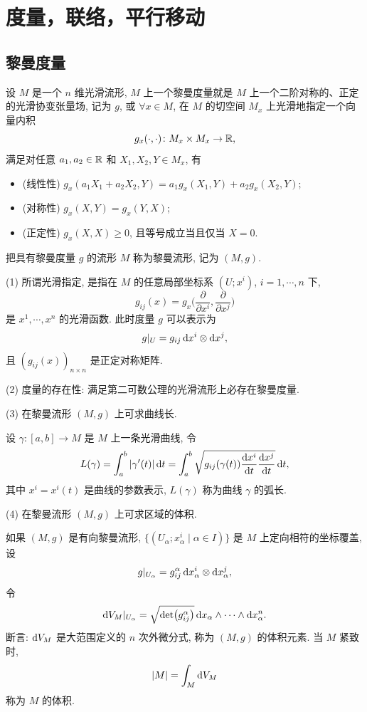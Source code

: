 \chapter{度量，联络，平行移动}



\section{黎曼度量}



\begin{definition}
  设 $M$ 是一个 $n$ 维光滑流形, $M$ 上一个黎曼度量就是 $M$ 上一个二阶对称的、正定的光滑协变张量场,
  记为 $g$, 或 $\forall x\in M$, 在 $M$ 的切空间 $M_x$ 上光滑地指定一个向量内积
  \[g_x(\cdot,\cdot)\colon M_x\times M_x\to\mathbb{R},\]
  满足对任意 $a_1,a_2\in\mathbb{R}$ 和 $X_1,X_2,Y\in M_x$, 有
  \begin{itemize}
    \item (线性性) $g_x(a_1X_1 + a_2X_2, Y) = a_1g_x(X_1,Y) + a_2g_x(X_2,Y)$;
    \item (对称性) $g_x(X,Y) = g_x(Y,X)$;
    \item (正定性) $g_x(X,X)\geq 0$, 且等号成立当且仅当 $X=0$.
  \end{itemize}
  把具有黎曼度量 $g$ 的流形 $M$ 称为黎曼流形, 记为 $(M,g)$.
\end{definition}


\begin{remark}
  (1) 所谓光滑指定, 是指在 $M$ 的任意局部坐标系 $(U;x^i)$, $i=1,\cdots,n$ 下,
  \[g_{ij}(x) = g_x\biggl(\frac{\partial}{\partial x^i}, \frac{\partial}{\partial x^j}\biggr)\]
  是 $x^1,\cdots,x^n$ 的光滑函数. 此时度量 $g$ 可以表示为
  \[g|_U = g_{ij}\mathop{}\!\mathrm{d} x^i\otimes\mathop{}\!\mathrm{d} x^j,\]
  且 $(g_{ij}(x))_{n\times n}$ 是正定对称矩阵.

  (2) 度量的存在性: 满足第二可数公理的光滑流形上必存在黎曼度量.

  (3) 在黎曼流形 $(M,g)$ 上可求曲线长.

  设 $\gamma: [a,b]\to M$ 是 $M$ 上一条光滑曲线, 令
  \[L(\gamma) = \int_a^b |\gamma'(t)|\mathop{}\!\mathrm{d} t
    = \int_a^b \sqrt{g_{ij}(\gamma(t))\frac{\mathop{}\!\mathrm{d} x^i}{\mathop{}\!\mathrm{d} t}\frac{\mathop{}\!\mathrm{d} x^j}{\mathop{}\!\mathrm{d} t}}\mathop{}\!\mathrm{d} t,\]
  其中 $x^i=x^i(t)$ 是曲线的参数表示, $L(\gamma)$ 称为曲线 $\gamma$ 的弧长.

  (4) 在黎曼流形 $(M,g)$ 上可求区域的体积.

  如果 $(M,g)$ 是有向黎曼流形, $\{(U_{\alpha}; x_{\alpha}^i\mid \alpha\in I)\}$
  是 $M$ 上定向相符的坐标覆盖, 设
  \[g|_{U_{\alpha}} = g_{ij}^{\alpha}\mathop{}\!\mathrm{d} x_{\alpha}^i\otimes\mathop{}\!\mathrm{d} x_{\alpha}^j,\]
  令
  \[\mathop{}\!\mathrm{d} V_M|_{U_{\alpha}} = \sqrt{\det\bigl(g_{ij}^{\alpha}\bigr)}
    \mathop{}\!\mathrm{d} x_{\alpha}\wedge\cdots\wedge\mathop{}\!\mathrm{d} x_{\alpha}^n.\]
  断言: $\mathop{}\!\mathrm{d} V_M$ 是大范围定义的 $n$ 次外微分式, 称为 $(M,g)$ 的体积元素. 当 $M$ 紧致时,
  \[|M| = \int_M \mathop{}\!\mathrm{d} V_M\]
  称为 $M$ 的体积.
\end{remark}



